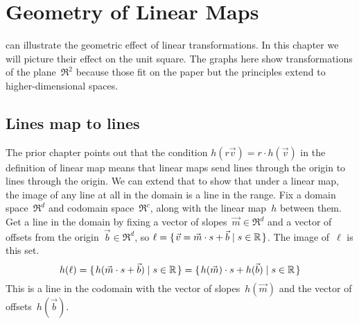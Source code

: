 \chapter{Geometry of Linear Maps}

\Sage{} can illustrate the geometric effect of linear transformations.
In this chapter we will picture their effect on the unit square.
The graphs here show transformations of the plane~$\Re^2$
because those fit on the paper but the principles extend to 
higher-dimensional spaces.




\section{Lines map to lines}
The prior chapter points out that 
the condition $h(r\vec{v})=r\cdot h(\vec{v})$ in the definition
of linear map means that
linear maps send lines through the origin to lines through the origin.
We can extend that to show that under a linear map, the image of any line
at all in the domain is a line in the range.
Fix a domain space~$\Re^d$ and codomain space~$\Re^c$, along with
the linear map~$h$ between them.
Get a line in the domain by fixing a vector of slopes~$\vec{m}\in\Re^d$
and a vector of offsets from the origin~$\vec{b}\in\Re^d$, so  
$\ell = \mbox{$\{\hspace{0.1em}\vec{v}=\vec{m}\cdot s +\vec{b}\mid s\in\mathbb{R}\hspace{0.1em}\}$}$.
The image of~$\ell$ is this set.
\begin{equation*}
  h(\ell)=\mbox{$\{\hspace{0.1em}h(\vec{m}\cdot s+\vec{b})\mid s\in\mathbb{R}\hspace{0.1em}\}$}
  =\mbox{$\{\hspace{0.1em}h(\vec{m})\cdot s+h(\vec{b})\mid s\in\mathbb{R}\hspace{0.1em}\}$}
\end{equation*}
This is a line in the codomain with the vector of 
slopes~$h(\vec{m})$ and the vector of offsets~$h(\vec{b})$. 

